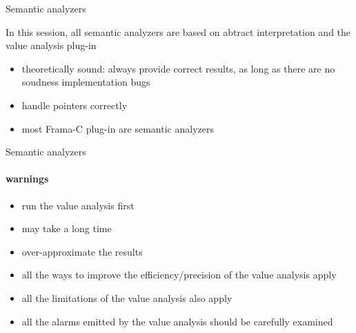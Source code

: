 \documentclass{beamer}
\newcommand{\orange}[1]{{\textcolor{frama-c-1}{#1}}}
\newcommand{\orangepale}[1]{{\textcolor{frama-c-2}{#1}}}
\newcommand{\vvert}[1]{{\textcolor{vert}{#1}}}
\newcommand{\intro}[1]{\begin{center}\vvert{#1}\end{center}}
\newenvironment{sect}[1]{\orange{#1}\begin{itemize}}{\end{itemize}}
\newenvironment{features}{\begin{sect}{Features}}{\end{sect}}
\newenvironment{warnings}{\begin{sect}{Warnings}}{\end{sect}}
\begin{document}
\begin{frame}{Semantic analyzers}

  \intro{In this session, all semantic analyzers are based on abtract interpretation and the value
    analysis plug-in}

\begin{features}
\item \orangepale{theoretically sound}: always provide correct results, as long
  as there are no soudness implementation bugs
\item \orangepale{handle pointers correctly}
\end{features}\medskip

\begin{sect}{Semantic analyzers within Frama-C}
\item most Frama-C plug-in are semantic analyzers
\end{sect}

\end{frame}


\begin{frame}{Semantic analyzers}
\framesubtitle{warnings}

\begin{warnings}
\item \orangepale{run the value analysis first}
\item may take a long time
\item over-approximate the results
\item all the ways to improve the efficiency/precision of the
  value analysis apply
\item all the limitations of the value analysis also apply
\item all the alarms emitted by the value analysis should be carefully
  examined
\end{warnings}

\end{frame}

\end{document}

